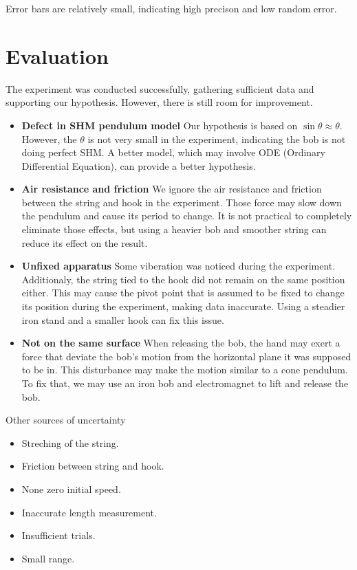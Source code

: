 \documentclass[a4paper]{article}
\begin{document}
Error bars are relatively small, indicating high precison and low random error. 


\section{Evaluation}

The experiment was conducted successfully, gathering sufficient data and supporting our hypothesis. However, there is still room for improvement. 

\begin{itemize}
    \item \textbf{Defect in SHM pendulum model} Our hypothesis is based on $\sin\theta\approx\theta$. However, the $\theta$ is not very small in the experiment, indicating the bob is not doing perfect SHM. A better model, which may involve ODE (Ordinary Differential Equation), can provide a better hypothesis.
    \item \textbf{Air resistance and friction} We ignore the air resistance and friction between the string and hook in the experiment. Those force may slow down the pendulum and cause its period to change. It is not practical to completely eliminate those effects, but using a heavier bob and smoother string can reduce its effect on the result. 
    \item \textbf{Unfixed apparatus} Some viberation was noticed during the experiment. Additionaly, the string tied to the hook did not remain on the same position either. This may cause the pivot point that is assumed to be fixed to change its position during the experiment, making data inaccurate. Using a steadier iron stand and a smaller hook can fix this issue. 
    \item \textbf{Not on the same surface} When releasing the bob, the hand may exert a force that deviate the bob's motion from the horizontal plane it was supposed to be in. This disturbance may make the motion similar to a cone pendulum. To fix that, we may use an iron bob and electromagnet to lift and release the bob.
\end{itemize}

\begin{tcolorbox}[title = Note]
    Other sources of uncertainty
    \begin{itemize}
        \item Streching of the string.
        \item Friction between string and hook.
        \item None zero initial speed.
        \item Inaccurate length measurement.
        \item Insufficient trials.
        \item Small range. 
    \end{itemize}
\end{tcolorbox}
\end{document}
